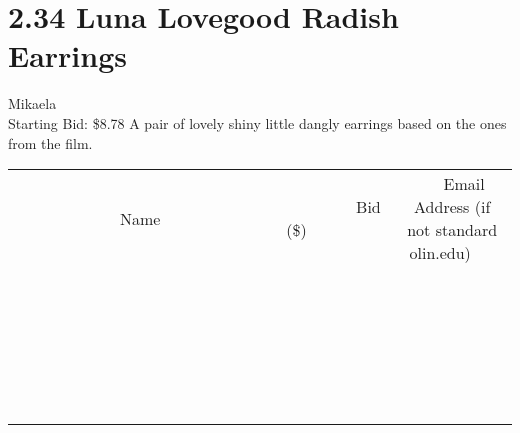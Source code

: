 \documentclass[11pt]{article}
\begin{document}
\section*{2.34 Luna Lovegood Radish Earrings}
Mikaela
\\
Starting Bid: \$8.78
\newline
A pair of lovely shiny little dangly earrings based on the ones from the film.
\\[6ex]
\begin{tabular}{c c c}
~~~~~~~~~~~~~Name~~~~~~~~~~~~~ & ~~~~~~~~~Bid (\$)~~~~~~~~~  & ~~~Email Address (if not standard olin.edu)~~~\\
 & & \\
\hline
 & & \\
\hline
 & & \\
\hline
 & & \\
\hline
 & & \\
\hline
 & & \\
\hline
 & & \\
\hline
 & & \\
\hline
 & & \\
\hline
 & & \\
\hline
 & & \\
\hline
 & & \\
\hline
 & & \\
\hline
 & & \\
\hline
 & & \\
\hline
 & & \\
\hline
 & & \\
\hline
 & & \\
\hline
 & & \\
\hline
 & & \\
\hline
 & & \\
\hline
 & & \\
\hline
 & & \\
\hline
 & & \\
\hline
 & & \\
\hline
 & & \\
\hline
\end{tabular}
\newpage
\end{document}
